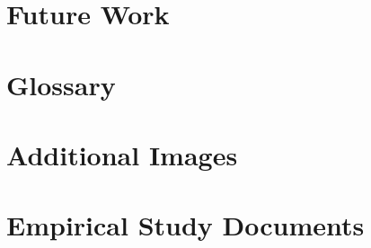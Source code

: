 \documentclass[]{article}
\begin{document}
\section{Future Work}

\newpage



\newpage

\begin{appendices}

\section{Glossary}
\clearpage{\pagestyle{empty}\cleardoublepage}


\section{ Additional Images}
\label{appendix:B}
\clearpage{\pagestyle{empty}\cleardoublepage}

\section{Empirical Study Documents}
\clearpage{\pagestyle{empty}\cleardoublepage}
\end{appendices}
\end{document}
